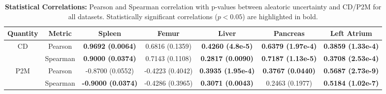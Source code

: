 \begin{table*}
\centering
\caption{\textbf{Statistical Correlations: } Pearson and Spearman correlation with p-values between aleatoric uncertainty and CD/P2M for all datasets. Statistically significant correlations (\(p < 0.05\)) are highlighted in bold.}
\label{tab:sample_wise_correlation}
\vspace{-2mm}
\footnotesize %
\begin{tabular}{|c|c|c|c|c|c|c|}
\hline
\textbf{Quantity} & \textbf{Metric} & \textbf{Spleen} & \textbf{Femur} & \textbf{Liver} & \textbf{Pancreas} & \textbf{Left Atrium} \\ \hline
\multirow{2}{*}{CD} 
& Pearson & \textbf{0.9692 (0.0064)} & 0.6816 (0.1359) & \textbf{0.4260 (4.8e-5)} & \textbf{0.6379 (1.97e-4)} & \textbf{0.3859 (1.33e-4)} \\ 
& Spearman & \textbf{0.9000 (0.0374)} & 0.7143 (0.1108) & \textbf{0.2817 (0.0090)} & \textbf{0.7187 (1.13e-5)} & \textbf{0.3708 (2.53e-4)} \\ \hline
\multirow{2}{*}{P2M} 
& Pearson & -0.8700 (0.0552) & -0.4223 (0.4042) & \textbf{0.3935 (1.95e-4)} & \textbf{0.3767 (0.0440)} & \textbf{0.5687 (2.73e-9)} \\ 
& Spearman &\textbf{ -0.9000 (0.0374)} & -0.4286 (0.3965) & \textbf{0.3071 (0.0043)} & 0.2463 (0.1977) & \textbf{0.5184 (1.02e-7)} \\ \hline
\end{tabular}

\end{table*}
